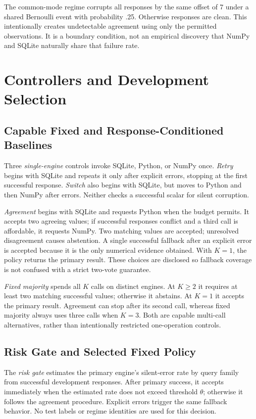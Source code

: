 \documentclass{svproc}
\begin{document}
The common-mode regime corrupts all responses by the same offset of 7 under a shared Bernoulli event with probability .25. Otherwise responses are clean. This intentionally creates undetectable agreement using only the permitted observations. It is a boundary condition, not an empirical discovery that NumPy and SQLite naturally share that failure rate.

\section{Controllers and Development Selection}
\subsection{Capable Fixed and Response-Conditioned Baselines}
Three \emph{single-engine} controls invoke SQLite, Python, or NumPy once. \emph{Retry} begins with SQLite and repeats it only after explicit errors, stopping at the first successful response. \emph{Switch} also begins with SQLite, but moves to Python and then NumPy after errors. Neither checks a successful scalar for silent corruption.

\emph{Agreement} begins with SQLite and requests Python when the budget permits. It accepts two agreeing values; if successful responses conflict and a third call is affordable, it requests NumPy. Two matching values are accepted; unresolved disagreement causes abstention. A single successful fallback after an explicit error is accepted because it is the only numerical evidence obtained. With $K=1$, the policy returns the primary result. These choices are disclosed so fallback coverage is not confused with a strict two-vote guarantee.

\emph{Fixed majority} spends all $K$ calls on distinct engines. At $K\geq2$ it requires at least two matching successful values; otherwise it abstains. At $K=1$ it accepts the primary result. Agreement can stop after its second call, whereas fixed majority always uses three calls when $K=3$. Both are capable multi-call alternatives, rather than intentionally restricted one-operation controls.

\subsection{Risk Gate and Selected Fixed Policy}
The \emph{risk gate} estimates the primary engine's silent-error rate by query family from successful development responses. After primary success, it accepts immediately when the estimated rate does not exceed threshold $\theta$; otherwise it follows the agreement procedure. Explicit errors trigger the same fallback behavior. No test labels or regime identities are used for this decision.
\end{document}
